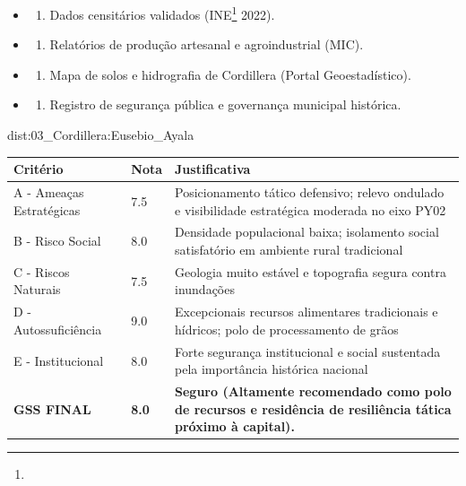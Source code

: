 {\begin{itemize}
\tightlist
\item
  \begin{enumerate}
  \def\labelenumi{\arabic{enumi})}
  \tightlist
  \item
    Dados censitários validados (INE\footnote{\fineINE} 2022).
  \end{enumerate}
\item
  \begin{enumerate}
  \def\labelenumi{\arabic{enumi})}
  \setcounter{enumi}{1}
  \tightlist
  \item
    Relatórios de produção artesanal e agroindustrial (MIC).
  \end{enumerate}
\item
  \begin{enumerate}
  \def\labelenumi{\arabic{enumi})}
  \setcounter{enumi}{2}
  \tightlist
  \item
    Mapa de solos e hidrografia de Cordillera (Portal Geoestadístico).
  \end{enumerate}
\item
  \begin{enumerate}
  \def\labelenumi{\arabic{enumi})}
  \setcounter{enumi}{3}
  \tightlist
  \item
    Registro de segurança pública e governança municipal histórica.
  \end{enumerate}
\end{itemize}}{dist:03_Cordillera:Eusebio_Ayala}
\begin{table}[ht!]
\small \begin{tabular}{p{3.0cm}p{0.8cm}p{6.0cm}} \toprule
\textbf{Critério} & \textbf{Nota} & \textbf{Justificativa} \\ \midrule
A - Ameaças Estratégicas & 7.5 & Posicionamento tático defensivo; relevo ondulado e visibilidade estratégica moderada no eixo PY02 \\
B - Risco Social & 8.0 & Densidade populacional baixa; isolamento social satisfatório em ambiente rural tradicional \\
C - Riscos Naturais & 7.5 & Geologia muito estável e topografia segura contra inundações \\
D - Autossuficiência & 9.0 & Excepcionais recursos alimentares tradicionais e hídricos; polo de processamento de grãos \\
E - Institucional & 8.0 & Forte segurança institucional e social sustentada pela importância histórica nacional \\
\midrule \textbf{GSS FINAL} & \textbf{8.0} & \textbf{Seguro (Altamente recomendado como polo de recursos e residência de resiliência tática próximo à capital).} \\ \bottomrule \end{tabular}
\end{table}
